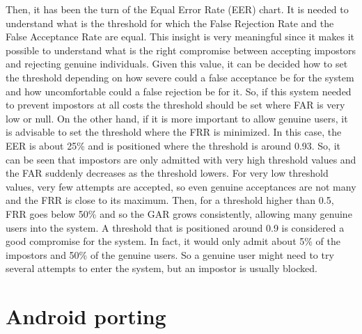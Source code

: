 \documentclass{article}
\begin{document}
Then, it has been the turn of the Equal Error Rate (EER) chart. It is needed to understand what
is the threshold for which the False Rejection Rate and the False Acceptance Rate are equal. 
This insight is very meaningful since it makes it possible to understand what is the right
compromise between accepting impostors and rejecting genuine individuals. Given this value,
it can be decided how to set the threshold depending on how severe could a false acceptance
be for the system and how uncomfortable could a false rejection be for it. So, if this system
needed to prevent impostors at all costs the threshold should be set where FAR is very low or 
null. On the other hand, if it is more important to allow genuine users, it is advisable to set
the threshold where the FRR is minimized. In this case, the EER is about 25\% and is positioned 
where the threshold is around 0.93. So, it can be seen that impostors are only admitted with very
high threshold values and the FAR suddenly decreases as the threshold lowers.
For very low threshold values, very few attempts are accepted, so even genuine acceptances are
not many and the FRR is close to its maximum. Then, for a threshold higher than 0.5, FRR goes 
below 50\% and so the GAR grows consistently, allowing many genuine users into the system. 
A threshold that is positioned around 0.9 is considered a good compromise for the system. In fact,
it would only admit about 5\% of the impostors and 50\% of the genuine users. So a genuine user
might need to try several attempts to enter the system, but an impostor is usually blocked.

\section{Android porting}
\end{document}
